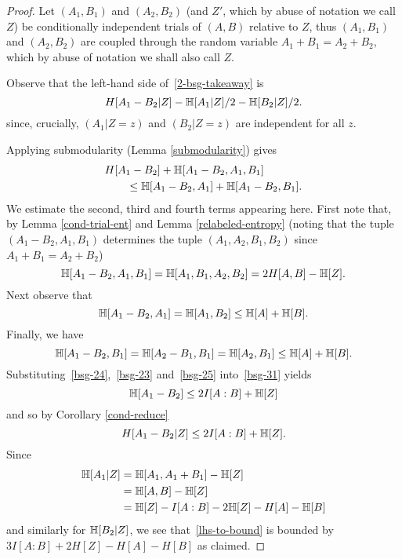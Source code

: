 \begin{proof}
Let $(A_1, B_1)$ and $(A_2, B_2)$ (and $Z'$, which by abuse of notation we call $Z$) be conditionally independent trials of $(A,B)$ relative to $Z$, thus $(A_1,B_1)$ and $(A_2,B_2)$ are coupled through the random variable $A_1 + B_1 = A_2 + B_2$, which by abuse of notation we shall also call $Z$.

Observe that the left-hand side of~\eqref{2-bsg-takeaway} is
\begin{equation}\label{lhs-to-bound}
H[A_1 - B_2| Z] - \mathbb{H}[A_1 | Z]/2 - \mathbb{H}[B_2 | Z]/2.
\end{equation}
since, crucially, $(A_1 | Z=z)$ and $(B_2 | Z=z)$ are independent for all $z$.

Applying submodularity (Lemma \ref{submodularity}) gives
\begin{equation}\label{bsg-31} \begin{split}
&H[A_1 - B_2] + \mathbb{H}[A_1 - B_2, A_1, B_1] \\
&\qquad \leq \mathbb{H}[A_1 - B_2, A_1] + \mathbb{H}[A_1 - B_2,B_1].
\end{split}\end{equation}
We estimate the second, third and fourth terms appearing here.
First note that, by Lemma \ref{cond-trial-ent} and Lemma \ref{relabeled-entropy} (noting that the tuple $(A_1 - B_2, A_1, B_1)$  determines the tuple $(A_1, A_2, B_1, B_2)$ since $A_1+B_1=A_2+B_2$)
\begin{equation}\label{bsg-24} \mathbb{H}[A_1 - B_2, A_1, B_1] = \mathbb{H}[A_1, B_1, A_2, B_2] = 2H[A,B] - \mathbb{H}[Z].\end{equation}
Next observe that
\begin{equation}\label{bsg-23} \mathbb{H}[A_1 - B_2, A_1] = \mathbb{H}[A_1, B_2] \leq \mathbb{H}[A] + \mathbb{H}[B].
\end{equation}
Finally, we have
\begin{equation}\label{bsg-25} \mathbb{H}[A_1 - B_2, B_1] = \mathbb{H}[A_2 - B_1, B_1] = \mathbb{H}[A_2, B_1] \leq \mathbb{H}[A] + \mathbb{H}[B].\end{equation}
Substituting~\eqref{bsg-24},~\eqref{bsg-23} and~\eqref{bsg-25} into~\eqref{bsg-31} yields
\[ \mathbb{H}[A_1 - B_2] \leq 2I[A:B] + \mathbb{H}[Z]\] and so by Corollary \ref{cond-reduce}
\[H[A_1 - B_2 | Z]  \leq 2I[A:B] + \mathbb{H}[Z].\]
Since
\begin{align*} \mathbb{H}[A_1 | Z] & = \mathbb{H}[A_1, A_1 + B_1] - \mathbb{H}[Z] \\ & = \mathbb{H}[A,B] - \mathbb{H}[Z] \\ & = \mathbb{H}[Z] - I[A:B] - 2 \mathbb{H}[Z]-H[A]-\mathbb{H}[B]\end{align*}
and similarly for $\mathbb{H}[B_2 | Z]$, we see that~\eqref{lhs-to-bound} is bounded by
$3I[A:B] + 2H[Z]-H[A]-H[B]$ as claimed.
\end{proof}


